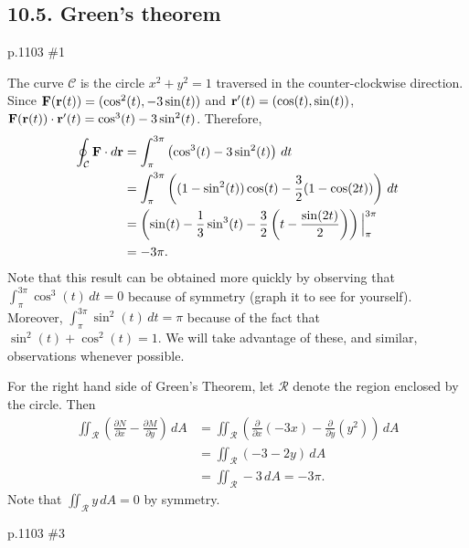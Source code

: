 \subsection{10.5. Green's theorem}
\begin{practice}p.1103 \#1\end{practice}
\begin{pracsol}
  The curve $\mathcal C$ is the circle $x^2+y^2=1$ traversed in the counter-clockwise direction. Since $\mathbf F(\mathbf r(t))=(\cos^2(t),-3\sin(t))$ and $\mathbf r'(t)=(\cos(t),\sin(t))$, $\mathbf F(\mathbf r(t))\cdot\mathbf r'(t)=\cos^3(t)-3\sin^2(t)$. Therefore,
  \[\begin{split}
    \oint_{\mathcal C}\mathbf F\cdot d\mathbf r &= \int_\pi^{3\pi}\left(\cos^3(t)-3\sin^2(t)\right)\,dt\\
    &= \int_\pi^{3\pi}\left((1-\sin^2(t))\cos(t)-\frac32(1-\cos(2t))\right)\,dt\\
    &= \left(\sin(t)-\frac13\sin^3(t)-\frac32\left(t-\frac{\sin(2t)}{2}\right)\right)\Big|_\pi^{3\pi}\\
    &= -3\pi.
  \end{split}\]
  Note that this result can be obtained more quickly by observing that $\int_\pi^{3\pi}\cos^3(t)\,dt=0$ because of symmetry (graph it to see for yourself). Moreover, $\int_\pi^{3\pi}\sin^2(t)\,dt=\pi$ because of the fact that $\sin^2(t)+\cos^2(t)=1$. We will take advantage of these, and similar, observations whenever possible.

  For the right hand side of Green's Theorem, let $\mathcal R$ denote the region enclosed by the circle. Then
  \[\begin{split}
    \iint_{\mathcal R}\left(\frac{\partial N}{\partial x}-\frac{\partial M}{\partial y}\right)\,dA &= \iint_{\mathcal R}\left(\frac{\partial}{\partial x}(-3x)-\frac{\partial}{\partial y}(y^2)\right)\,dA\\
    &= \iint_{\mathcal R}(-3-2y)\,dA\\
    &= \iint_{\mathcal{R}}-3\,dA = -3\pi.
  \end{split}\]
  Note that $\iint_{\mathcal R}y\,dA=0$ by symmetry.
\end{pracsol}
\begin{practice}p.1103 \#3\end{practice}
